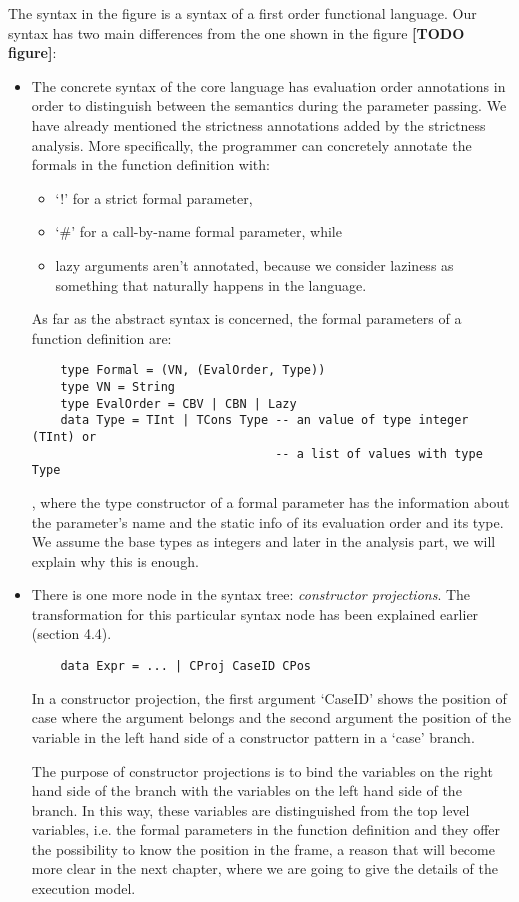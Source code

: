 \documentclass[diploma]{softlab-thesis}
\begin{document}
The syntax in the figure is a syntax of a first order functional language. Our syntax has two main 
differences from the one shown in the figure \textbf{[TODO figure]}:
\begin{itemize}
  \item The concrete syntax of the core language has evaluation order annotations in order to 
  distinguish between the semantics during the parameter passing. We have already mentioned the 
  strictness annotations added by the strictness analysis. 
  More specifically, the programmer can concretely annotate the formals in the function definition with:
    \begin{itemize}
      \item {`!' for a strict formal parameter,}
      \item { `\#' for a call-by-name formal parameter, while}
      \item {lazy arguments aren't annotated, because we consider laziness as something that naturally happens 
      in the language.}
    \end{itemize}
  
  As far as the abstract syntax is concerned, the formal parameters of a function definition are:
  \begin{verbatim}
    type Formal = (VN, (EvalOrder, Type))
    type VN = String 
    type EvalOrder = CBV | CBN | Lazy 
    data Type = TInt | TCons Type -- an value of type integer (TInt) or 
                                  -- a list of values with type Type
  \end{verbatim}
  , where the type constructor of a formal parameter has the information about the parameter's name and 
  the static info of its evaluation order and its type. We assume the base types as integers and later in 
  the analysis part, we will explain why this is enough.

  \item There is one more node in the syntax tree: \textit{constructor projections}. The transformation for this 
  particular syntax node has been explained earlier (section 4.4). 
  \begin{verbatim}
    data Expr = ... | CProj CaseID CPos 
  \end{verbatim}
  In a constructor projection, the first argument `CaseID' shows the position of case where the argument belongs
  and the second argument the position of the variable in the left hand side of a constructor pattern in a `case' branch.
  
  The purpose of constructor projections is to bind the variables on the right hand side of the branch with the variables 
  on the left hand side of the branch. In this way, these variables are distinguished from the top level variables, i.e.
  the formal parameters in the function definition and they offer the possibility to know the position in the frame, 
  a reason that will become more clear in the next chapter, where we are going to give the details of the 
  execution model.
\end{itemize}
\end{document}
